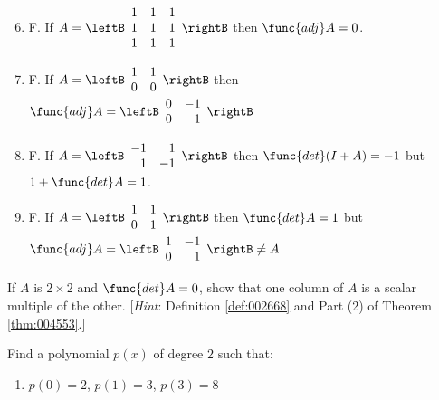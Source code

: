 \begin{multicols}{2}
\begin{ex}
\begin{sol}
\begin{enumerate}[label={\alph*.}]
\setcounter{enumi}{5}
\item  F. If $A = \leftB \begin{array}{rrr}
1 & 1 & 1 \\
1 & 1 & 1 \\
1 & 1 & 1
\end{array}\rightB$
 then $\func{adj }A = 0$.

\setcounter{enumi}{7}
\item  F. If  $A = \leftB \begin{array}{rr}
1 & 1 \\
0 & 0 
\end{array}\rightB$
 then $\func{adj } A = \leftB \begin{array}{rr}
0 & -1 \\
0 & 1 
\end{array}\rightB$

\setcounter{enumi}{9}
\item F. If $A = \leftB \begin{array}{rr}
-1 & 1 \\
1 & -1 
\end{array}\rightB$
 then $\func{det}(I + A) = -1$ but $1 + \func{det }A = 1$.

\setcounter{enumi}{11}
\item F. If $A = \leftB \begin{array}{rr}
1 & 1 \\
0 & 1 
\end{array}\rightB$ 
 then $\func{det }A = 1$ but $\func{adj } A = \leftB \begin{array}{rr}
1 & -1 \\
0 & 1 
\end{array}\rightB \neq A$
\end{enumerate}
\end{sol}
\end{ex}

\begin{ex}
If $A$ is $2 \times 2$ and $\func{det }A = 0$, show that one column of $A$ is a scalar multiple of the other. [\textit{Hint}: Definition \ref{def:002668} and Part (2) of Theorem \ref{thm:004553}.]
\end{ex}

\begin{ex}
Find a polynomial $p(x)$ of degree $2$ such that:


\begin{enumerate}[label={\alph*.}]
\item $p(0) = 2$, $p(1) = 3$, $p(3) = 8$


\end{enumerate}
\end{ex}
\end{multicols}
